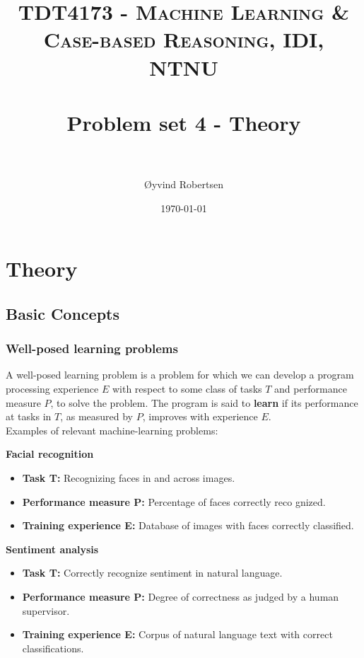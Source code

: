 \documentclass[paper=a4, fontsize=11pt]{scrartcl} %
\title{	
    \normalfont \normalsize 
    \textsc{TDT4173 - Machine Learning \& Case-based Reasoning, IDI, NTNU} \\ [25pt] %
    \horrule{0.5pt} \\[0.4cm] %
    \huge Problem set 4 - Theory \\ %
    \horrule{2pt} \\[0.5cm] %
}
\author{Øyvind Robertsen} %
\date{\normalsize\today} %
\numberwithin{equation}{section} %
\numberwithin{figure}{section} %
\numberwithin{table}{section} %
\begin{document}
\maketitle %


\section{Theory}

\subsection{Basic Concepts}

\subsubsection{Well-posed learning problems}

A well-posed learning problem is a problem for which we can develop a program processing experience $E$ with respect to some class of tasks $T$ and performance measure $P$, to solve the problem. The program is said to \textbf{learn} if its performance at tasks in $T$, as measured by $P$, improves with experience $E$. \\

Examples of relevant machine-learning problems:

\begin{description}
    \item \textbf{Facial recognition} \hfill \\
        \begin{itemize}
            \item \textbf{Task T:} Recognizing faces in and across images.
            \item \textbf{Performance measure P:} Percentage of faces correctly reco gnized.
            \item \textbf{Training experience E:} Database of images with faces correctly classified.
        \end{itemize}
    \item \textbf{Sentiment analysis} \hfill \\
        \begin{itemize}
            \item \textbf{Task T:} Correctly recognize sentiment in natural language.
            \item \textbf{Performance measure P:} Degree of correctness as judged by a human supervisor.
            \item \textbf{Training experience E:} Corpus of natural language text with correct classifications.
        \end{itemize}
\end{description}
\end{document}
